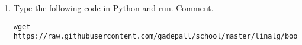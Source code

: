 \begin{enumerate}[label=\arabic*.,ref=\thesubsection.\theenumi]

%
%
%
%
%
%
%
%

%
\item
	Type the following code in Python and run.  Comment.

%
\begin{lstlisting}
wget 
https://raw.githubusercontent.com/gadepall/school/master/linalg/book/matrix/codes/Prob1_7.py
\end{lstlisting}
\end{enumerate}

